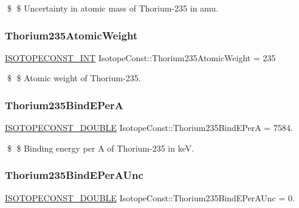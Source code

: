 \$ \$ Uncertainty in atomic mass of Thorium-\/235 in amu. \mbox{\label{group___isotope_const-_thorium-_th235_gada9fdd4f107585b9da6579779fc26ec4}} 
\subsubsection{\texorpdfstring{Thorium235\+Atomic\+Weight}{Thorium235AtomicWeight}}
{\footnotesize\ttfamily \mbox{\hyperlink{group___isotope_const-_macros_ga5f18360b3e99483a35c32d789e62621c}{I\+S\+O\+T\+O\+P\+E\+C\+O\+N\+S\+T\+\_\+\+I\+NT}} Isotope\+Const\+::\+Thorium235\+Atomic\+Weight = 235}

\$ \$ Atomic weight of Thorium-\/235. \mbox{\label{group___isotope_const-_thorium-_th235_ga5f6798b1a04c4790db4259e4265233fc}} 
\subsubsection{\texorpdfstring{Thorium235\+Bind\+E\+PerA}{Thorium235BindEPerA}}
{\footnotesize\ttfamily \mbox{\hyperlink{group___isotope_const-_macros_ga8f45a7272ce02c0b4c65c44636ed719a}{I\+S\+O\+T\+O\+P\+E\+C\+O\+N\+S\+T\+\_\+\+D\+O\+U\+B\+LE}} Isotope\+Const\+::\+Thorium235\+Bind\+E\+PerA = 7584.}

\$ \$ Binding energy per A of Thorium-\/235 in keV. \mbox{\label{group___isotope_const-_thorium-_th235_gae0203fd97b49b4a26175452c809f45a3}} 
\subsubsection{\texorpdfstring{Thorium235\+Bind\+E\+Per\+A\+Unc}{Thorium235BindEPerAUnc}}
{\footnotesize\ttfamily \mbox{\hyperlink{group___isotope_const-_macros_ga8f45a7272ce02c0b4c65c44636ed719a}{I\+S\+O\+T\+O\+P\+E\+C\+O\+N\+S\+T\+\_\+\+D\+O\+U\+B\+LE}} Isotope\+Const\+::\+Thorium235\+Bind\+E\+Per\+A\+Unc = 0.}

